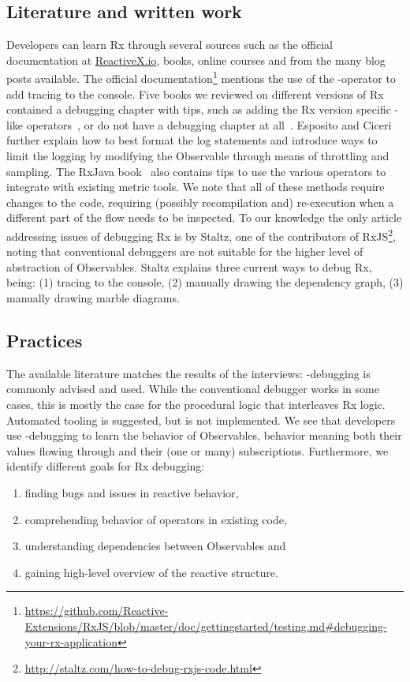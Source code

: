 \subsection{Literature and written work}
Developers can learn Rx through several sources such as the official documentation at \href{http://reactivex.io}{ReactiveX.io}, books, online courses and from the many blog posts available. The official documentation\footnote{
	\url{https://github.com/Reactive-Extensions/RxJS/blob/master/doc/gettingstarted/testing.md\#debugging-your-rx-application}
} mentions the use of the -operator to add tracing to the console. Five books we reviewed on different versions of Rx contained a debugging chapter with tips, such as adding the Rx version specific -like operators~\cite{esposito2016reactive,rxjavabook2016}, or do not have a debugging chapter at all~\cite{introtorx, rxjavabook2015, rxswiftbook2017}. Esposito and Ciceri~\cite{esposito2016reactive} further explain how to best format the log statements and introduce ways to limit the logging by modifying the Observable through means of throttling and sampling. The RxJava book~\cite{rxjavabook2016} also contains tips to use the various  operators to integrate with existing metric tools. We note that all of these methods require changes to the code, requiring (possibly recompilation and) re-execution when a different part of the flow needs to be inspected.
To our knowledge the only article addressing issues of debugging Rx is by Staltz, one of the contributors of RxJS\footnote{\url{http://staltz.com/how-to-debug-rxjs-code.html}}, noting that conventional debuggers are not suitable for the higher level of abstraction of Observables. Staltz explains three current ways to debug Rx, being: (1) tracing to the console, (2) manually drawing the dependency graph, (3) manually drawing marble diagrams.

\subsection{Practices}
The available literature matches the results of the interviews: -debugging is commonly advised and used. While the conventional debugger works in some cases, this is mostly the case for the procedural logic that interleaves Rx logic. Automated tooling is suggested, but is not implemented. We see that developers use -debugging to learn the behavior of Observables, behavior meaning both their values flowing through and their (one or many) subscriptions. Furthermore, we identify different goals for Rx debugging:
\begin{enumerate}
\itemsep0em 
\item[(1)] finding bugs and issues in reactive behavior,
\item[(2)] comprehending behavior of operators in existing code,
\item[(3)] understanding dependencies between Observables and
\item[(4)] gaining high-level overview of the reactive structure.
\end{enumerate}